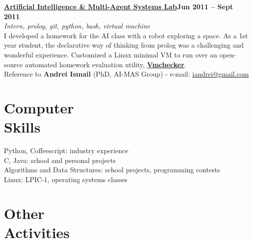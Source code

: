 \documentclass[margin,line]{resume}
\begin{document}
\begin{resume}
	\vspace{1.2mm}\href{http://aimas.cs.pub.ro/}{\textbf{Artificial Intelligence \& Multi-Agent Systems Lab}}\hfill \textbf{Jun 2011 -- Sept 2011}\vspace{1.2mm}\\
	\vspace{1mm} \textsl{Intern, prolog, git, python, bash, virtual machine}\vspace{1.5mm}\\
	I developed a homework for the AI class with a robot exploring a space. As a 1st year student, the declarative way of thinking from prolog was a challenging and wonderful experience. Customized a Linux minimal VM to run over an open-source automated homework evaluation utility, \href{https://elf.cs.pub.ro/vmchecker/ui/?locale=en}{\textbf{Vmchecker}}.\vspace{1.5mm}\\
	\small{Reference to \textbf{Andrei Ismail} (PhD, AI-MAS Group) - e-mail: \href{mailto:iandrei@gmail.com}{iandrei@gmail.com}}

    \section{\mysidestyle Computer\\Skills}

	Python, Coffeescript: industry experience\\
	C, Java: school and personal projects\\
	Algorithms and Data Structures: school projects, programming contests\\
	Linux: LPIC-1, operating systems classes


    \section{\mysidestyle Other\\Activities}


\end{resume}
\end{document}
